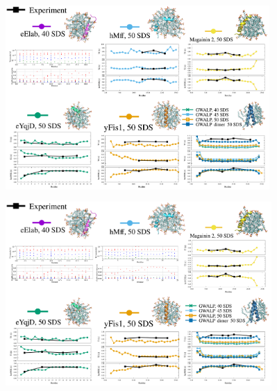 \documentclass{beamer}
\begin{document}
\addtocounter{framenumber}{-1}
\begin{frame}
\begin{center}


\vspace{0.5cm}


\includegraphics[height=7cm]{all_pep9.pdf}
\end{center}
\end{frame}



\addtocounter{framenumber}{-1}
\begin{frame}
\begin{center}


\vspace{0.5cm}


\includegraphics[height=7cm]{all_pep10.pdf}
\end{center}
\end{frame}
\end{document}
